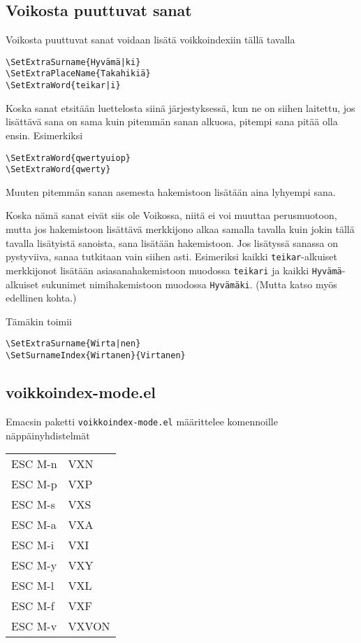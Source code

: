 \documentclass[12pt]{article}
\begin{document}
\subsection*{Voikosta puuttuvat sanat}

Voikosta puuttuvat sanat voidaan lisätä voikkoindexiin tällä tavalla

\begin{verbatim}
\SetExtraSurname{Hyvämä|ki}
\SetExtraPlaceName{Takahikiä}
\SetExtraWord{teikar|i}
\end{verbatim}

Koska sanat etsitään luettelosta siinä järjestyksessä, kun ne on
siihen laitettu, jos lisättävä sana on sama kuin pitemmän sanan
alkuosa, pitempi sana pitää olla ensin. Esimerkiksi

\begin{verbatim}
\SetExtraWord{qwertyuiop}
\SetExtraWord{qwerty}
\end{verbatim}

Muuten pitemmän sanan asemesta hakemistoon lisätään aina lyhyempi
sana.

Koska nämä sanat eivät siis ole Voikossa, niitä ei voi muuttaa
perusmuotoon, mutta jos hakemistoon lisättävä merkkijono alkaa samalla
tavalla kuin jokin tällä tavalla lisätyistä sanoista, sana lisätään
hakemistoon. Jos lisätyssä sanassa on pystyviiva, sanaa tutkitaan vain
siihen asti. Esimeriksi kaikki \verb=teikar=-alkuiset merkkijonot
lisätään asiasanahakemistoon muodossa \verb=teikari= ja kaikki
\verb=Hyvämä=-alkuiset sukunimet nimihakemistoon muodossa
\verb=Hyvämäki=. (Mutta katso myös edellinen kohta.)

Tämäkin toimii

\begin{verbatim}
\SetExtraSurname{Wirta|nen}
\SetSurnameIndex{Wirtanen}{Virtanen}
\end{verbatim}


\newpage
\subsection*{voikkoindex-mode.el}

Emacsin paketti \verb=voikkoindex-mode.el= määrittelee komennoille
näppäinyhdistelmät

\begin{tabular}{@{}ll}
ESC M-n & VXN \\
ESC M-p & VXP \\
ESC M-s & VXS \\
ESC M-a & VXA \\
ESC M-i & VXI \\
ESC M-y & VXY \\
ESC M-l & VXL \\
ESC M-f & VXF \\
ESC M-v & VXVON
\end{tabular}
\end{document}
